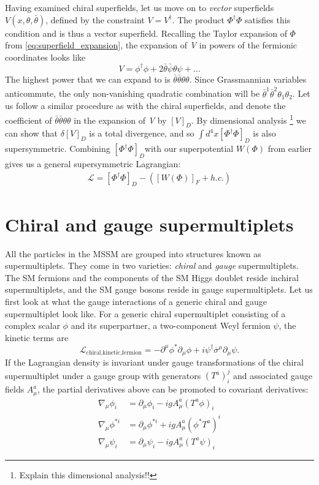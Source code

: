 Having examined chiral superfields, let us move on to \emph{vector} superfields $V(x,\theta,\bar{\theta})$, defined by the constraint $V = V^\dagger$. The product $\Phi^\dagger\Phi$ satisfies this condition and is thus a vector superfield. Recalling the Taylor expansion of $\Phi$ from \autoref{eq:superfield_expansion}, the expansion of \emph{V} in powers of the fermionic coordinates looks like
\[V = \phi^\dagger\phi + 2\bar{\theta}\bar{\psi}\theta\psi + ...\]
The highest power that we can expand to is $\bar{\theta}\bar{\theta}\theta\theta$. Since Grassmannian variables anticommute, the only non-vanishing quadratic combination will be $\bar{\theta}^{\dot{1}}\bar{\theta}^{\dot{2}}\theta_1\theta_2$. Let us follow a similar procedure as with the chiral superfields, and denote the coefficient of $\bar{\theta}\bar{\theta}\theta\theta$ in the expansion of \emph{V} by $[V]_D$. By dimensional analysis \footnote{Explain this dimensional analysis!!} we can show that $\delta[V]_D$ is a total divergence, and so $\int d^4x[\Phi^\dagger\Phi]_D$ is also supersymmetric. Combining $[\Phi^\dagger\Phi]_D$with our superpotential $W(\Phi)$ from earlier gives us a general supersymmetric Lagrangian:
\begin{align*}
  \mathcal{L} = [\Phi^\dagger\Phi]_D - \left([W(\Phi)]_F + h.c.\right)
\end{align*}

\section{Chiral and gauge supermultiplets}
All the particles in the MSSM are grouped into structures known as supermultiplets. They come in two varieties: \emph{chiral} and \emph{gauge} supermultiplets. The SM fermions and the components of the SM Higgs doublet reside inchiral supermultiplets, and the SM gauge bosons reside in gauge supermultiplets. Let us first look at what the gauge interactions of a generic chiral and gauge supermultiplet look like.
For a generic chiral supermultiplet consisting of a complex scalar $\phi$ and its superpartner, a two-component Weyl fermion $\psi$, the kinetic terms are 
\[\mathcal{L}_{\text{chiral,kinetic,fermion}} = -\partial^\mu\phi^*\partial_\mu\phi + i\psi^{\dagger}\overline{\sigma}^\mu\partial_\mu\psi.\]
If the Lagrangian density is invariant under gauge transformations of the chiral supermultiplet under a gauge group with generators $(T^a)_i^j$ and associated gauge fields $A_\mu^a$, the partial derivatives above can be promoted to covariant derivatives:
\begin{align}
  \nabla_\mu\phi_i &= \partial_\mu\phi_i - igA_\mu^a(T^a\phi)_i\label{eq:phi1}\\
  \nabla_\mu\phi^{*i} &= \partial_\mu\phi^{*i} + igA_\mu^a(\phi^*T^a)^{i}\label{eq:phi2}\\
  \nabla_\mu\psi_i &= \partial_\mu\psi_i - igA_\mu^a(T^a\psi)_i\label{eq:psi}
\end{align}

